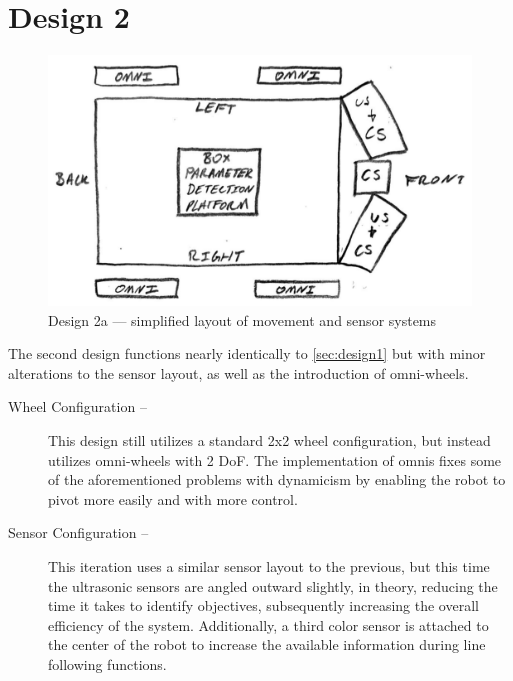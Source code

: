 \documentclass[11pt]{report}
\begin{document}
\newpage
\section{Design 2}\label{sec:design2}
\begin{figure}[H]
    \centering
    \hspace*{2em}
    \includegraphics[width=0.5\linewidth]{Images//Designs/Design2a.pdf}
    \caption{Design 2a --- simplified layout of movement and sensor systems}
    \label{fig:design2a}
\end{figure}
The second design functions nearly identically to \cref{sec:design1} but with minor alterations to the sensor layout, as well as the introduction of \gls{omni}-wheels.

\begin{description}
    \item[Wheel Configuration --] This design still utilizes a standard 2x2 wheel configuration, but instead utilizes \gls{omni}-wheels with 2 \gls{DoF}. The implementation of \glspl{omni} fixes some of the aforementioned problems with dynamicism by enabling the robot to pivot more easily and with more control.
    \item[Sensor Configuration --] This iteration uses a similar sensor layout to the previous, but this time the ultrasonic sensors are angled outward slightly, in theory, reducing the time it takes to identify objectives, subsequently increasing the overall efficiency of the system. Additionally, a third color sensor is attached to the center of the robot to increase the available information during line following functions.
\end{description}
\end{document}
